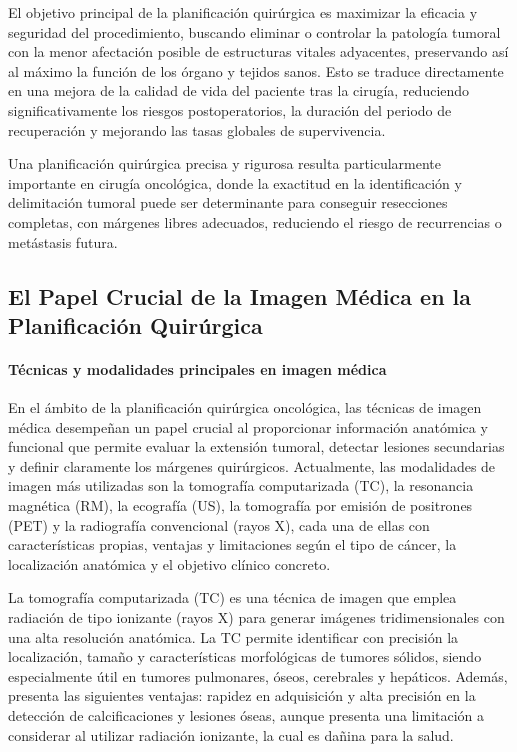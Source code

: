 El objetivo principal de la planificación quirúrgica es maximizar la eficacia y seguridad del procedimiento, buscando eliminar o controlar la patología tumoral con la menor afectación posible de estructuras vitales adyacentes, preservando así al máximo la función de los órgano y tejidos sanos. Esto se traduce directamente en una mejora de la calidad de vida del paciente tras la cirugía, reduciendo significativamente los riesgos postoperatorios, la duración del periodo de recuperación y mejorando las tasas globales de supervivencia\cite{Birkmeyer2012}. 

Una planificación quirúrgica precisa y rigurosa resulta particularmente importante en cirugía oncológica, donde la exactitud en la identificación y delimitación tumoral puede ser determinante para conseguir resecciones completas, con márgenes libres adecuados, reduciendo el riesgo de recurrencias o metástasis futura\cite{NCCN2023}.

\subsection{El Papel Crucial de la Imagen Médica en la Planificación Quirúrgica}
\label{sec:medical-image-surgical-planning}

 

\paragraph{Técnicas y modalidades principales en imagen médica} 

En el ámbito de la planificación quirúrgica oncológica, las técnicas de imagen médica desempeñan un papel crucial al proporcionar información anatómica y funcional que permite evaluar la extensión tumoral, detectar lesiones secundarias y definir claramente los márgenes quirúrgicos. Actualmente, las modalidades de imagen más utilizadas son la tomografía computarizada (TC), la resonancia magnética (RM), la ecografía (US), la tomografía por emisión de positrones (PET) y la radiografía convencional (rayos X), cada una de ellas con características propias, ventajas y limitaciones según el tipo de cáncer, la localización anatómica y el objetivo clínico concreto. 

La tomografía computarizada (TC) es una técnica de imagen que emplea radiación de tipo ionizante (rayos X) para generar imágenes tridimensionales con una alta resolución anatómica. La TC permite identificar con precisión la localización, tamaño y características morfológicas de tumores sólidos, siendo especialmente útil en tumores pulmonares, óseos, cerebrales y hepáticos. Además, presenta las siguientes ventajas:  rapidez en adquisición y alta precisión en la detección de calcificaciones y lesiones óseas, aunque presenta una limitación a considerar al utilizar radiación ionizante, la cual es dañina para la salud\cite{image_guided_cancer_surgery}. 


